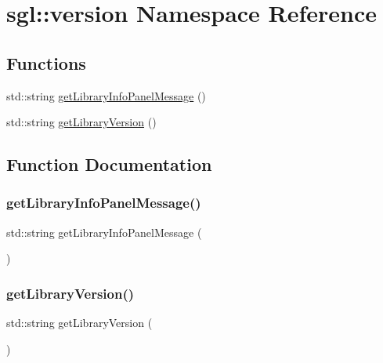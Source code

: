 \hypertarget{namespacesgl_1_1version}{}\section{sgl\+:\+:version Namespace Reference}
\label{namespacesgl_1_1version}
\subsection*{Functions}
\begin{DoxyCompactItemize}
\item 
std\+::string \mbox{\hyperlink{namespacesgl_1_1version_a1ddb4527643468187978f5732f306ee8}{get\+Library\+Info\+Panel\+Message}} ()
\item 
std\+::string \mbox{\hyperlink{namespacesgl_1_1version_acfe02dedce4026ebabe4a4e4806795ab}{get\+Library\+Version}} ()
\end{DoxyCompactItemize}


\subsection{Function Documentation}
\mbox{\label{namespacesgl_1_1version_a1ddb4527643468187978f5732f306ee8}} 
\subsubsection{\texorpdfstring{get\+Library\+Info\+Panel\+Message()}{getLibraryInfoPanelMessage()}}
{\footnotesize\ttfamily std\+::string get\+Library\+Info\+Panel\+Message (\begin{DoxyParamCaption}{ }\end{DoxyParamCaption})}

\mbox{\label{namespacesgl_1_1version_acfe02dedce4026ebabe4a4e4806795ab}} 
\subsubsection{\texorpdfstring{get\+Library\+Version()}{getLibraryVersion()}}
{\footnotesize\ttfamily std\+::string get\+Library\+Version (\begin{DoxyParamCaption}{ }\end{DoxyParamCaption})}

